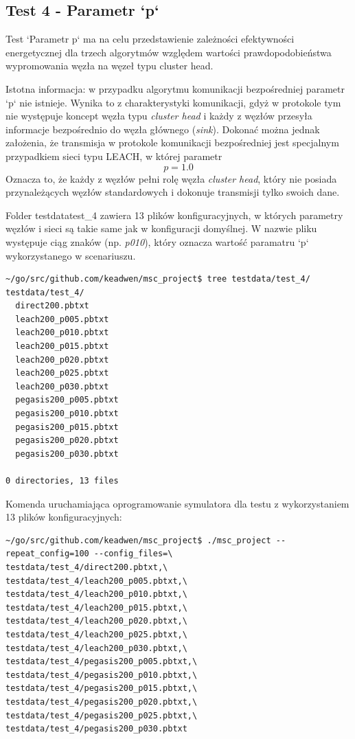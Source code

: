 \documentclass[a4paper,12pt,twoside,openany]{report}
\begin{document}
\subsection{Test 4 - Parametr `p`}

Test `Parametr p` ma na celu przedstawienie zależności efektywności energetycznej dla trzech algorytmów względem wartości prawdopodobieństwa wypromowania węzła na węzeł
typu cluster head. 

Istotna informacja: w przypadku algorytmu komunikacji bezpośredniej parametr `p` nie istnieje. Wynika to z charakterystyki komunikacji, gdyż w protokole
tym nie występuje koncept węzła typu \textit{cluster head} i każdy z węzłów przesyła informacje bezpośrednio do węzła głównego (\textit{sink}). Dokonać można jednak założenia, że 
transmisja w protokole komunikacji bezpośredniej jest specjalnym przypadkiem sieci typu LEACH, w której parametr \[ p = 1.0 \]
Oznacza to, że każdy z węzłów pełni rolę węzła \textit{cluster head}, który nie posiada przynależących węzłów standardowych i dokonuje transmisji tylko swoich dane.

Folder testdata\/test\_4 zawiera 13 plików konfiguracyjnych, w których parametry węzłów i sieci są takie same jak w konfiguracji domyślnej.
W nazwie pliku występuje ciąg znaków (np. \textit{p010}), który oznacza wartość paramatru `p` wykorzystanego w scenariuszu.

\begin{lstlisting}
~/go/src/github.com/keadwen/msc_project$ tree testdata/test_4/
testdata/test_4/
  direct200.pbtxt
  leach200_p005.pbtxt
  leach200_p010.pbtxt
  leach200_p015.pbtxt
  leach200_p020.pbtxt
  leach200_p025.pbtxt
  leach200_p030.pbtxt
  pegasis200_p005.pbtxt
  pegasis200_p010.pbtxt
  pegasis200_p015.pbtxt
  pegasis200_p020.pbtxt
  pegasis200_p030.pbtxt

0 directories, 13 files
\end{lstlisting}

Komenda uruchamiająca oprogramowanie symulatora dla testu z wykorzystaniem 13 plików konfiguracyjnych:

\begin{lstlisting}
~/go/src/github.com/keadwen/msc_project$ ./msc_project --repeat_config=100 --config_files=\
testdata/test_4/direct200.pbtxt,\
testdata/test_4/leach200_p005.pbtxt,\
testdata/test_4/leach200_p010.pbtxt,\
testdata/test_4/leach200_p015.pbtxt,\
testdata/test_4/leach200_p020.pbtxt,\
testdata/test_4/leach200_p025.pbtxt,\
testdata/test_4/leach200_p030.pbtxt,\
testdata/test_4/pegasis200_p005.pbtxt,\
testdata/test_4/pegasis200_p010.pbtxt,\
testdata/test_4/pegasis200_p015.pbtxt,\
testdata/test_4/pegasis200_p020.pbtxt,\
testdata/test_4/pegasis200_p025.pbtxt,\
testdata/test_4/pegasis200_p030.pbtxt
\end{lstlisting}
\end{document}
